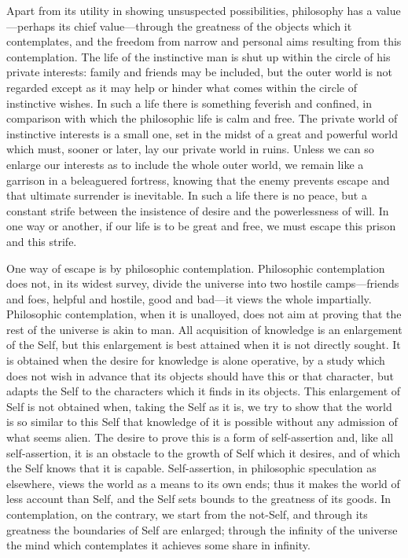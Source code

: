Apart from its utility in showing unsuspected possibilities,
philosophy has a val\-ue---perhaps its chief val\-ue---through the
greatness of the objects which it contemplates, and the freedom from
narrow and personal aims resulting from this contemplation. The life
of the instinctive man is shut up within the circle of his private
interests: family and friends may be included, but the outer world is
not regarded except as it may help or hinder what comes within the
circle of instinctive wishes. In such a life there is something
feverish and confined, in comparison with which the philosophic life
is calm and free. The private world of instinctive interests is a
small one, set in the midst of a great and powerful world which must,
sooner or later, lay our private world in ruins. Unless we can so
enlarge our interests as to include the whole outer world, we remain
like a garrison in a beleaguered fortress, knowing that the enemy
prevents escape and that ultimate surrender  is inevitable.
In such a life there is no peace, but a constant strife between the
insistence of desire and the powerlessness of will. In one way or
another, if our life is to be great and free, we must escape this
prison and this strife.

One way of escape is by philosophic contemplation. Philosophic
contemplation does not, in its widest survey, divide the universe into
two hostile camps---friends and foes, helpful and hostile, good and
bad---it views the whole impartially. Philosophic contemplation, when
it is unalloyed, does not aim at proving that the rest of the universe
is akin to man. All acquisition of knowledge is an enlargement of the
Self, but this enlargement is best attained when it is not directly
sought. It is obtained when the desire for knowledge is alone
operative, by a study which does not wish in advance that its objects
should have this or that character, but adapts the Self to the
characters which it finds in its objects. This enlargement of Self is
not obtained when, taking the Self as it is, we try to show that the
world is so similar  to this Self that knowledge of it is
possible without any admission of what seems alien. The desire to
prove this is a form of self-assertion and, like all self-assertion,
it is an obstacle to the growth of Self which it desires, and of which
the Self knows that it is capable. Self-assertion, in philosophic
speculation as elsewhere, views the world as a means to its own ends;
thus it makes the world of less account than Self, and the Self sets
bounds to the greatness of its goods. In contemplation, on the
contrary, we start from the not-Self, and through its greatness the
boundaries of Self are enlarged; through the infinity of the universe
the mind which contemplates it achieves some share in infinity.

